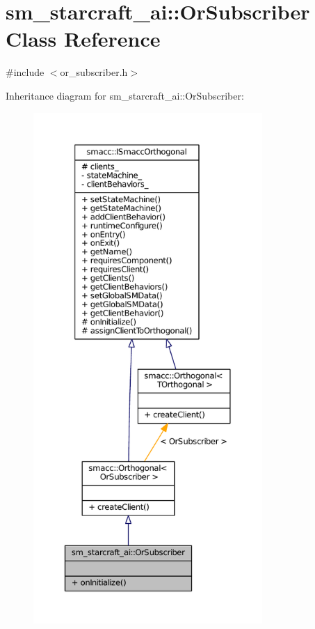\hypertarget{classsm__starcraft__ai_1_1OrSubscriber}{}\section{sm\+\_\+starcraft\+\_\+ai\+:\+:Or\+Subscriber Class Reference}
\label{classsm__starcraft__ai_1_1OrSubscriber}


{\ttfamily \#include $<$or\+\_\+subscriber.\+h$>$}



Inheritance diagram for sm\+\_\+starcraft\+\_\+ai\+:\+:Or\+Subscriber\+:
\nopagebreak
\begin{figure}[H]
\begin{center}
\leavevmode
\includegraphics[height=550pt]{classsm__starcraft__ai_1_1OrSubscriber__inherit__graph}
\end{center}
\end{figure}



